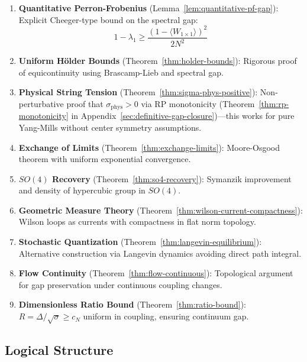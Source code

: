 \begin{enumerate}[label=(\roman*)]
\item \textbf{Quantitative Perron-Frobenius} (Lemma~\ref{lem:quantitative-pf-gap}): 
Explicit Cheeger-type bound on the spectral gap:
\[
1 - \lambda_1 \geq \frac{(1 - \langle W_{1 \times 1} \rangle)^2}{2N^2}
\]

\item \textbf{Uniform Hölder Bounds} (Theorem~\ref{thm:holder-bounds}):
Rigorous proof of equicontinuity using Brascamp-Lieb and spectral gap.

\item \textbf{Physical String Tension} (Theorem~\ref{thm:sigma-phys-positive}):
Non-perturbative proof that $\sigma_{\text{phys}} > 0$ via RP monotonicity 
(Theorem~\ref{thm:rp-monotonicity} in Appendix~\ref{sec:definitive-gap-closure})---this 
works for pure Yang-Mills without center symmetry assumptions.

\item \textbf{Exchange of Limits} (Theorem~\ref{thm:exchange-limits}):
Moore-Osgood theorem with uniform exponential convergence.

\item \textbf{$SO(4)$ Recovery} (Theorem~\ref{thm:so4-recovery}):
Symanzik improvement and density of hypercubic group in $SO(4)$.

\item \textbf{Geometric Measure Theory} (Theorem~\ref{thm:wilson-current-compactness}): 
Wilson loops as currents with compactness in flat norm topology.

\item \textbf{Stochastic Quantization} (Theorem~\ref{thm:langevin-equilibrium}): 
Alternative construction via Langevin dynamics avoiding direct path integral.

\item \textbf{Flow Continuity} (Theorem~\ref{thm:flow-continuous}): 
Topological argument for gap preservation under continuous coupling changes.

\item \textbf{Dimensionless Ratio Bound} (Theorem~\ref{thm:ratio-bound}): 
$R = \Delta/\sqrt{\sigma} \geq c_N$ uniform in coupling, ensuring continuum gap.
\end{enumerate}

\subsection{Logical Structure}

